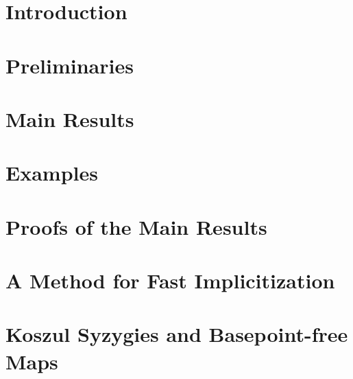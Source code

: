 \documentclass[phd,tocprelim]{cornell}
\numberwithin{first}{chapter}
\begin{document}
\contentspage
\tablelistpage
\figurelistpage

\normalspacing \setcounter{page}{1} 
\pagestyle{cornell} \addtolength{\parskip}{0.5\baselineskip}


\chapter{Introduction}
\label{ch:intro}


\chapter{Preliminaries}
\label{ch:preliminaries}


\chapter{Main Results}
\label{ch:main-results}


\chapter{Examples}
\label{ch:examples}


\chapter{Proofs of the Main Results}
\label{ch:main-proofs}


\chapter{A Method for Fast Implicitization}
\label{ch:fast-method}


\chapter{Koszul Syzygies and Basepoint-free Maps}
\label{ch:koszul-bpf}


% 



\end{document}
